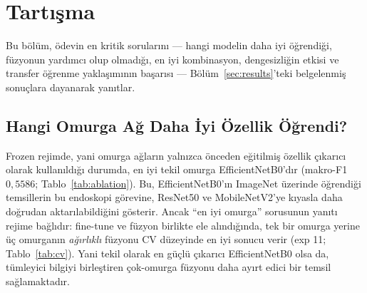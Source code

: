 \section{Tartışma}
\label{sec:discussion}

Bu bölüm, ödevin en kritik sorularını --- hangi modelin daha iyi öğrendiği,
füzyonun yardımcı olup olmadığı, en iyi kombinasyon, dengesizliğin etkisi ve
transfer öğrenme yaklaşımının başarısı --- Bölüm~\ref{sec:results}'teki
belgelenmiş sonuçlara dayanarak yanıtlar.

\subsection{Hangi Omurga Ağ Daha İyi Özellik Öğrendi?}
\label{subsec:disc-backbone}
Frozen rejimde, yani omurga ağların yalnızca önceden eğitilmiş özellik çıkarıcı
olarak kullanıldığı durumda, en iyi tekil omurga EfficientNetB0'dır (makro-F1
$0{,}5586$; Tablo~\ref{tab:ablation}). Bu, EfficientNetB0'ın ImageNet üzerinde
öğrendiği temsillerin bu endoskopi görevine, ResNet50 ve MobileNetV2'ye kıyasla
daha doğrudan aktarılabildiğini gösterir. Ancak ``en iyi omurga'' sorusunun
yanıtı rejime bağlıdır: fine-tune ve füzyon birlikte ele alındığında, tek bir
omurga yerine üç omurganın \emph{ağırlıklı} füzyonu CV düzeyinde en iyi sonucu
verir (exp 11; Tablo~\ref{tab:cv}). Yani tekil olarak en güçlü çıkarıcı
EfficientNetB0 olsa da, tümleyici bilgiyi birleştiren çok-omurga füzyonu daha
ayırt edici bir temsil sağlamaktadır.

